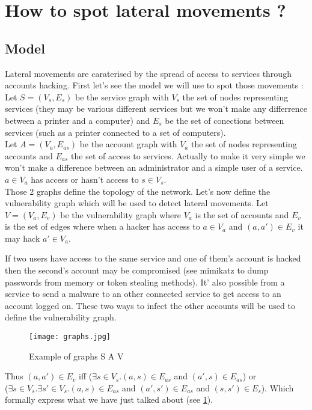 \documentclass[11pt]{article}
\begin{document}
\section{How to spot lateral movements ?}
\subsection{Model}
\indent Lateral movements are caraterised by the spread of access to services through accounts hacking. First let's see the model we will use to spot those movements :\\
\indent Let $S=(V_s,E_s)$ be the service graph with $V_s$ the set of nodes representing services (they may be various different services but we won't make any differrence between a printer and a computer) and $E_s$ be the set of conections between services (such as a printer connected to a set of computers).\\
\indent Let $A=(V_a,E_{as})$ be the account graph with $V_a$ the set of nodes representing accounts and $E_{as}$ the set of access to services. Actually to make it very simple we won't make a difference between an administrator and a simple user of a service. $a\in V_a$ has access or hasn't access to $s\in V_s$.\\
\indent Those 2 graphs define the topology of the network. Let's now define the vulnerability graph which will be used to detect lateral movements. Let $V=(V_a,E_v)$ be the vulnerability graph where $V_a$ is the set of accounts and $E_v$ is the set of edges where when a hacker has access to $a\in V_a$ and $(a,a')\in E_v$ it may hack $a'\in V_a$. 

If two users have access to the same service and one of them's account is hacked then the second's account may be compromised (see mimikatz to dump passwords from memory or token stealing methods). It' also possible from a service to send a malware to an other connected service to get access to an account logged on. These two ways to infect the other accounts will be used to define the vulnerability graph. 

\begin{figure}[!h]
\centering
\texttt{[image: graphs.jpg]}
\caption{Example of graphs S A V}
\label{graphs}
\end{figure}

Thus $(a,a')\in E_v$ iff ($\exists s\in V_s. (a,s)\in E_{as}$ and $(a',s)\in E_{as}$) or\\ ($\exists s\in V_s. \exists s'\in V_s. (a,s)\in E_{as}$ and $(a',s')\in E_{as}$ and $(s,s')\in E_s$). Which formally express what we have just talked about (see \ref{graphs}).
\end{document}
